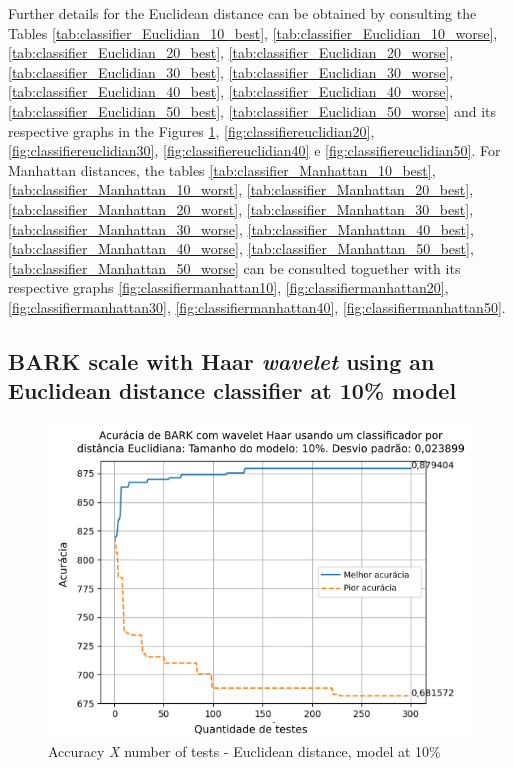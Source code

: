 \par Further details for the Euclidean distance can be obtained by consulting the Tables
 \ref{tab:classifier_Euclidian_10_best}, \ref{tab:classifier_Euclidian_10_worse},
\ref{tab:classifier_Euclidian_20_best}, \ref{tab:classifier_Euclidian_20_worse}, 
\ref{tab:classifier_Euclidian_30_best}, \ref{tab:classifier_Euclidian_30_worse}, 
\ref{tab:classifier_Euclidian_40_best}, \ref{tab:classifier_Euclidian_40_worse}, 
\ref{tab:classifier_Euclidian_50_best}, \ref{tab:classifier_Euclidian_50_worse}
and its respective graphs in the Figures \ref{fig:classifiereuclidian10}, \ref{fig:classifiereuclidian20}, \ref{fig:classifiereuclidian30}, \ref{fig:classifiereuclidian40} e \ref{fig:classifiereuclidian50}. For Manhattan distances, the tables \ref{tab:classifier_Manhattan_10_best}, \ref{tab:classifier_Manhattan_10_worst}, 
\ref{tab:classifier_Manhattan_20_best}, \ref{tab:classifier_Manhattan_20_worst}, 
\ref{tab:classifier_Manhattan_30_best}, \ref{tab:classifier_Manhattan_30_worse}, 
\ref{tab:classifier_Manhattan_40_best}, \ref{tab:classifier_Manhattan_40_worse}, 
\ref{tab:classifier_Manhattan_50_best}, \ref{tab:classifier_Manhattan_50_worse} 
can be consulted toguether with its respective graphs \ref{fig:classifiermanhattan10}, \ref{fig:classifiermanhattan20}, \ref{fig:classifiermanhattan30}, \ref{fig:classifiermanhattan40}, \ref{fig:classifiermanhattan50}.\\



\newpage
\subsection{BARK scale with Haar \textit{wavelet} using an Euclidean distance classifier at 10\% model}



\begin{figure}[!h]
	\centering
	\includegraphics[width=\linewidth]{images/results/confusionMatrices/classifier_Euclidian_10}
	\caption{Accuracy \textit{X} number of tests - Euclidean distance, model at 10\%}
	\label{fig:classifiereuclidian10}
\end{figure}

